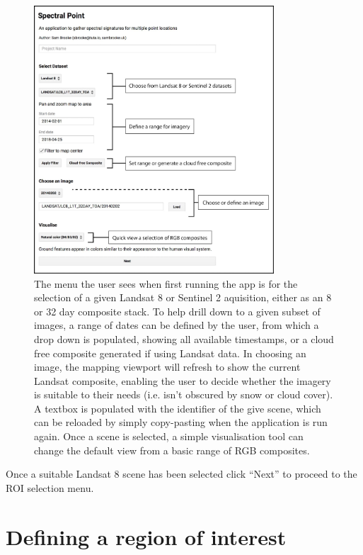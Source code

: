 \documentclass[12pt]{article}
\begin{document}
\begin{figure}[htbp]
\centering
\includegraphics[width=0.8\textwidth]{images/choose_imagery_reduced.jpg}
\caption{The menu the user sees when first running the app is for the selection of a given Landsat 8 or Sentinel 2 aquisition, either as an 8 or 32 day composite stack. To help drill down to a given subset of images, a range of dates can be defined by the user, from which a drop down is populated, showing all available timestamps, or a cloud free composite generated if using Landsat data. In choosing an image, the mapping viewport will refresh to show the current Landsat composite, enabling the user to decide whether the imagery is suitable to their needs (i.e. isn't obscured by snow or cloud cover). A textbox is populated with the identifier of the give scene, which can be reloaded by simply copy-pasting when the application is run again. Once a scene is selected, a simple visualisation tool can change the default view from a basic range of RGB composites.}
\label{fig:choose_imagery}
\end{figure}

Once a suitable Landsat 8 scene has been selected click ``Next'' to proceed to the ROI selection menu.

\section{Defining a region of interest}
\end{document}
